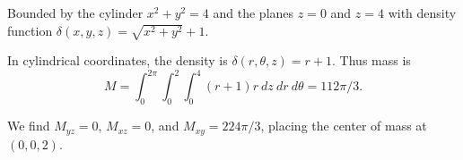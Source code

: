 {
Bounded by the cylinder $x^2+y^2=4$ and the planes $z=0$ and $z=4$ with density function $\delta(x,y,z) =\sqrt{x^2+y^2}+1$. 
}
{In cylindrical coordinates, the density is $\delta(r,\theta,z) = r+1$. Thus mass is
$$M=\int_0^{2\pi}\int_0^2\int_0^4 (r+1)r\ dz\ dr\ d\theta = 112\pi/3.$$

We find $M_{yz} = 0$, $M_{xz} = 0$, and $M_{xy} = 224\pi/3$, placing the center of mass at $(0,0,2)$.


}
